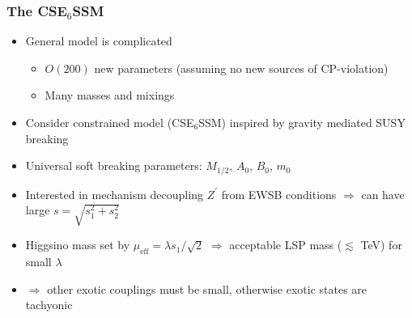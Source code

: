 \documentclass[10pt,aspectratio=169]{beamer}
\begin{document}
\begin{frame}
  \frametitle{The CSE$_6$SSM}
  \begin{itemize}
    \vfill
    \item {\color{red} General model is complicated}
          \begin{itemize}
            \item $O(200)$ new parameters (assuming no new sources of
                  CP-violation)
            \item Many masses and mixings
          \end{itemize}
    \vfill
    \item Consider constrained model (CSE$_6$SSM) inspired by gravity
          mediated SUSY breaking
    \vfill
  \item {\color{blue} Universal soft breaking parameters: $M_{1/2}$, $A_0$,
    $B_0$, $m_0$}
    \vfill
    \item Interested in mechanism decoupling $Z^\prime$ from EWSB conditions
          $\Rightarrow$ can have large $s = \sqrt{s_1^2 + s_2^2}$
    \vfill
    \item Higgsino mass set by $\mu_{\text{eff}} = \lambda s_1 / \sqrt{2}$
      $\Rightarrow$ acceptable LSP mass ($\lesssim$ TeV) for small
      $\lambda$
    \vfill
    \item $\Rightarrow$ other exotic couplings must be small,
          otherwise exotic states are tachyonic
  \end{itemize}
\end{frame}
\end{document}
